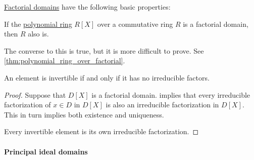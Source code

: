 \begin{proposition}\label{thm:def:factorial_domain}
  \hyperref[def:factorial_domain]{Factorial domains} have the following basic properties:
  \begin{thmenum}
     If the \hyperref[def:polynomial_algebra]{polynomial ring} \( R[X] \) over a commutative ring \( R \) is a factorial domain, then \( R \) also is.

    The converse to this is true, but it is more difficult to prove. See \cref{thm:polynomial_ring_over_factorial}.

     An element is invertible if and only if it has no irreducible factors.
  \end{thmenum}
\end{proposition}
\begin{proof}
   Suppose that \( D[X] \) is a factorial domain.  implies that every irreducible factorization of \( x \in D \) in \( D[X] \) is also an irreducible factorization in \( D[X] \). This in turn implies both existence and uniqueness.

   Every invertible element is its own irreducible factorization.
\end{proof}

\paragraph{Principal ideal domains}

